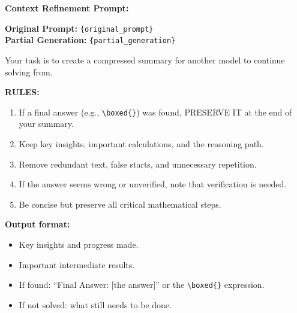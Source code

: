 \documentclass{article}
\begin{document}
  \begin{tcolorbox}[
  colback=teal!5,
  colframe=teal!70!black,
  coltitle=white,
  title={\textbf{Math summarizer prompt} (preserve-answer v3; replaces $y_{1:t}$ with $\tilde y$ when fired)},
  label=box:math_summarizer,
  fonttitle=\small,
  boxrule=0.5pt,
  arc=2pt,        %
  left=6pt, right=6pt  %
  ]
  \small
\textbf{Context Refinement Prompt:}

  \medskip
  \textbf{Original Prompt:} \texttt{\{original\_prompt\}}\\
  \textbf{Partial Generation:} \texttt{\{partial\_generation\}}

  \medskip
Your task is to create a compressed summary for another model to continue solving from.

  \medskip
  \textbf{RULES:}
  \begin{enumerate}\setlength\itemsep{0pt}\setlength\topsep{0pt}
  \item If a final answer (e.g., \verb|\boxed{}|) was found, PRESERVE IT at the end of your summary.
  \item Keep key insights, important calculations, and the reasoning path.
  \item Remove redundant text, false starts, and unnecessary repetition.
  \item If the answer seems wrong or unverified, note that verification is needed.
  \item Be concise but preserve all critical mathematical steps.
  \end{enumerate}

  \textbf{Output format:}
  \begin{itemize}\setlength\itemsep{0pt}\setlength\topsep{0pt}
  \item Key insights and progress made.
  \item Important intermediate results.
  \item If found: ``Final Answer: [the answer]'' or the \verb|\boxed{}| expression.
  \item If not solved: what still needs to be done.
  \end{itemize}
  \end{tcolorbox}
\end{document}
